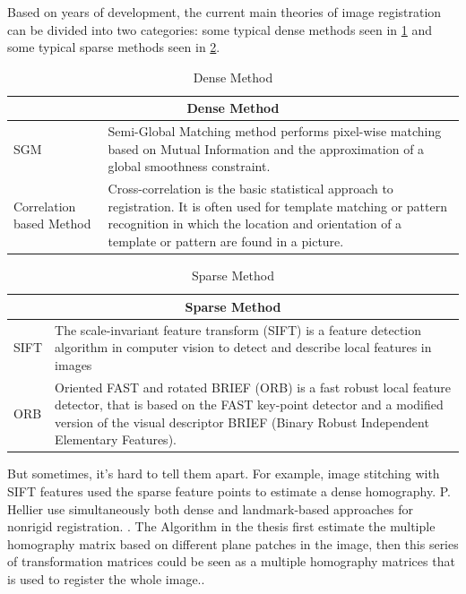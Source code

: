 Based on years of development, the current main theories of image registration can be divided into two categories: some typical dense methods seen in \cref{tab:Dense Method} and some typical sparse methods seen in \cref{tab:Sparse Method}.

\begin{table}[htbp]
	\centering
	\scriptsize  
	\begin{tabular}{p{50pt} p{300pt}}
		\toprule
		\multicolumn{2}{c}{\bfseries Dense Method}\\ \midrule
		  SGM   &  Semi-Global Matching method  performs pixel-wise matching based on Mutual Information and the approximation of a global smoothness constraint. \cite{hirschmullerAccurateEfficientStereo2005}     \\
		Correlation based Method  &  Cross-correlation is the basic statistical approach to registration. It is often used for template matching or pattern recognition in which the location and orientation of a template or pattern are found in a picture. \cite{gruenAdaptiveLeastSquares1985a}       \\ \bottomrule
	\end{tabular}
	\caption{Dense Method}  
	\label{tab:Dense Method} 
\end{table}

\begin{table}[htbp]
	\centering
	\scriptsize  
	\begin{tabular}{p{50pt} p{300pt}}
		\toprule
		\multicolumn{2}{c}{\bfseries Sparse Method}\\ \midrule
		SIFT   &  The scale-invariant feature transform (SIFT) is a feature detection algorithm in computer vision to detect and describe local features in images \cite{loweObjectRecognitionLocal1999}   \\
		ORB  &  Oriented FAST and rotated BRIEF (ORB) is a fast robust local feature detector, that  is based on the FAST key-point detector and a modified version of the visual descriptor BRIEF (Binary Robust Independent Elementary Features). \cite{rubleeORBEfficientAlternative2011}      \\ \bottomrule
	\end{tabular}
	\caption{Sparse Method}  
	\label{tab:Sparse Method} 
\end{table}

But sometimes, it's hard to tell them apart. For example, image stitching with SIFT features used the sparse feature points to estimate a dense homography. P. Hellier use simultaneously both dense and landmark-based approaches for nonrigid registration. \cite{hellierCouplingDenseLandmarkbased2003}. The Algorithm in the thesis first estimate the multiple homography matrix based on different plane patches in the image, then this series of transformation matrices could be seen as a  multiple homography matrices that is used to register the whole image..

